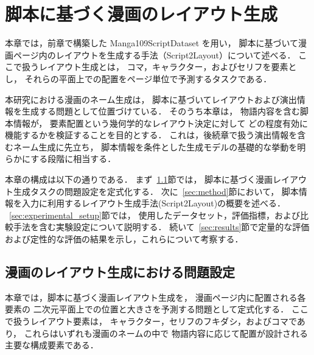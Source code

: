 \documentclass[a4j,12pt,dvipdfmx]{jsreport}
\begin{document}
\ifdefined\ismain\else
  \pagestyle{fancy}
  \lhead{\rightmark}
  \renewcommand{\chaptermark}[1]{\markboth{第\ \thechapter\ 章\ #1}{}}
  \setlength{\headheight}{16.5pt}
  \titleformat{\chapter}[hang]{\LARGE\bfseries}{\prechaptername\thechapter\postchaptername}{1em}{}
\fi

\chapter{脚本に基づく漫画のレイアウト生成}\label{chap:script2layout}

本章では，前章で構築した Manga109ScriptDataset を用い，
脚本に基づいて漫画ページ内のレイアウトを生成する手法（Script2Layout）について述べる．
ここで扱うレイアウト生成とは，
コマ，キャラクター，およびセリフを要素とし，
それらの平面上での配置をページ単位で予測するタスクである．

本研究における漫画のネーム生成は，
脚本に基づいてレイアウトおよび演出情報を生成する問題として位置づけている．
そのうち本章は，
物語内容を含む脚本情報が，
要素配置という幾何学的なレイアウト決定に対して
どの程度有効に機能するかを検証することを目的とする．
これは，後続章で扱う演出情報を含むネーム生成に先立ち，
脚本情報を条件とした生成モデルの基礎的な挙動を明らかにする段階に相当する．

本章の構成は以下の通りである．
まず~\ref{sec:problem_formulation}節では，
脚本に基づく漫画レイアウト生成タスクの問題設定を定式化する．
次に~\ref{sec:method}節において，
脚本情報を入力に利用するレイアウト生成手法(Script2Layout)の概要を述べる．
~\ref{sec:experimental_setup}節では，
使用したデータセット，評価指標，および比較手法を含む実験設定について説明する．
続いて~\ref{sec:results}節で定量的な評価および定性的な評価の結果を示し，これらについて考察する．


\section{漫画のレイアウト生成における問題設定}\label{sec:problem_formulation}

本章では，脚本に基づく漫画レイアウト生成を，
漫画ページ内に配置される各要素の
二次元平面上での位置と大きさを予測する問題として定式化する．
ここで扱うレイアウト要素は，
キャラクター，セリフのフキダシ，およびコマであり，
これらはいずれも漫画のネームの中で
物語内容に応じて配置が設計される主要な構成要素である．
\end{document}
